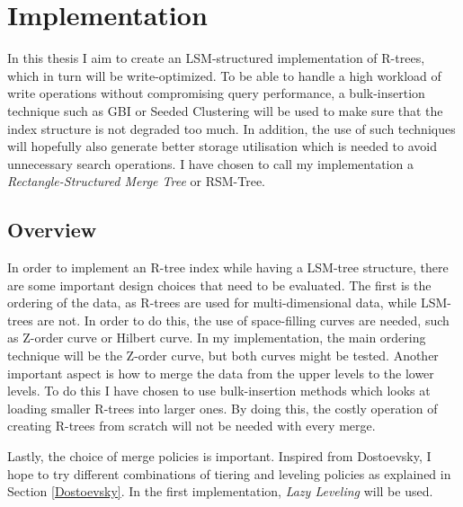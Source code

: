 \chapter{Implementation}

In this thesis I aim to create an LSM-structured implementation of R-trees, which in turn will be write-optimized. To be able to handle a high workload of write operations without compromising query performance, a bulk-insertion technique such as GBI\cite{GBI} or Seeded Clustering\cite{SeededClustering} will be used to make sure that the index structure is not degraded too much. In addition, the use of such techniques will hopefully also generate better storage utilisation which is needed to avoid unnecessary search operations. I have chosen to call my implementation a \emph{Rectangle-Structured Merge Tree} or RSM-Tree.

\section{Overview}
In order to implement an R-tree index while having a LSM-tree structure, there are some important design choices that need to be evaluated. The first is the ordering of the data, as R-trees are used for multi-dimensional data, while LSM-trees are not. In order to do this, the use of space-filling curves are needed, such as Z-order curve or Hilbert curve. In my implementation, the main ordering technique will be the Z-order curve, but both curves might be tested. Another important aspect is how to merge the data from the upper levels to the lower levels. To do this I have chosen to use bulk-insertion methods which looks at loading smaller R-trees into larger ones. By doing this, the costly operation of creating R-trees from scratch will not be needed with every merge.\newline

\noindent
Lastly, the choice of merge policies is important. Inspired from Dostoevsky\cite{Dostoevsky}, I hope to try different combinations of tiering and leveling policies as explained in Section \ref{Dostoevsky}. In the first implementation, \emph{Lazy Leveling} will be used.  

